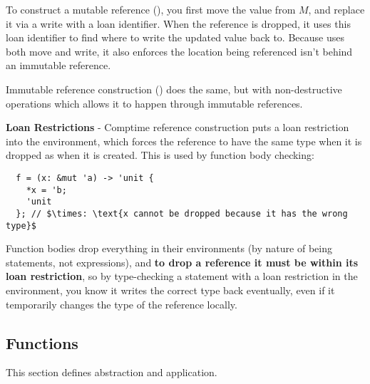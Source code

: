 \documentclass[12pt,twoside]{report}
\begin{document}
To construct a mutable reference (), you first move the value from $M$, and replace it via a write with a loan identifier. When the reference is dropped, it uses this loan identifier to find where to write the updated value back to. Because  uses both move and write, it also enforces the location being referenced isn't behind an immutable reference.

Immutable reference construction () does the same, but with non-destructive operations which allows it to happen through immutable references.

\textbf{Loan Restrictions} - Comptime reference construction puts a loan restriction into the environment, which forces the reference to have the same type when it is dropped as when it is created. This is used by function body checking:

\begin{verbatim}
  f = (x: &mut 'a) -> 'unit {
    *x = 'b;
    'unit
  }; // $\times: \text{x cannot be dropped because it has the wrong type}$
\end{verbatim}

Function bodies drop everything in their environments (by nature of being statements, not expressions), and \textbf{to drop a reference it must be within its loan restriction}, so by type-checking a statement with a loan restriction in the environment, you know it writes the correct type back eventually, even if it temporarily changes the type of the reference locally.

\subsection{Functions}
\label{section:formalfunctions}
This section defines abstraction and application.
\end{document}
